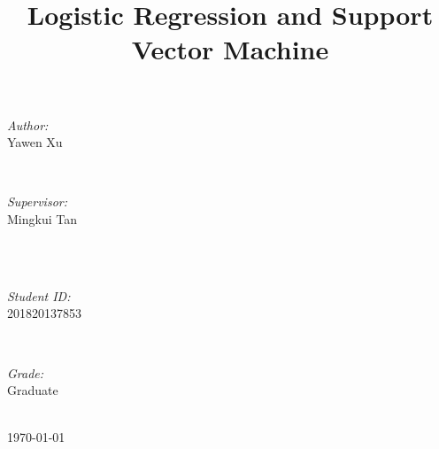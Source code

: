 \documentclass[journal, a4paper]{IEEEtran}
\begin{document}
\begin{titlepage}
\begin{minipage}{0.4\textwidth}
\begin{flushleft} \large
\emph{Author:}\\
Yawen Xu %
\end{flushleft}
\end{minipage}
~
\begin{minipage}{0.4\textwidth}
\begin{flushright} \large
\emph{Supervisor:} \\
Mingkui Tan %
\end{flushright}
\end{minipage}\\[2cm]
~
\begin{minipage}{0.4\textwidth}
\begin{flushleft} \large
\emph{Student ID:}\\
201820137853
\end{flushleft}
\end{minipage}
~
\begin{minipage}{0.4\textwidth}
\begin{flushright} \large
\emph{Grade:} \\
Graduate
\end{flushright}
\end{minipage}\\[2cm]



{\large \today}\\[2cm] %



\vfill %

\end{titlepage}

	\title{Logistic Regression and Support Vector Machine}
	\maketitle
\end{document}
